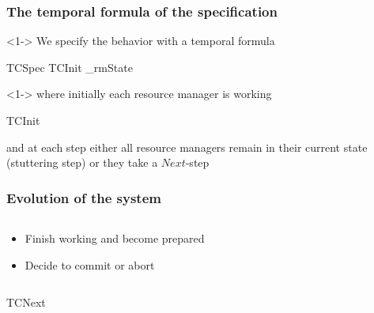 \begin{frame}
    \frametitle{The temporal formula of the specification}
    \begin{uncoverenv}<1->
            We specify the behavior with a temporal formula
        \begin{tlabox}
            TCSpec  TCInit \land \Box [TCNext\,]_{rmState}
        \end{tlabox}
    \end{uncoverenv}
    \begin{uncoverenv}<1->
        where initially each resource manager is working
        \begin{tlabox}
            TCInit 
        \end{tlabox}
        and at each step either all resource managers remain in their
        current state (stuttering step) or they take a $Next$-step
    \end{uncoverenv}
\end{frame}

\begin{frame}
    \frametitle{Evolution of the system}

    \begin{columns}[c]
    \begin{column}{0.65\textwidth}

        \begin{itemize}
            \item<2> Finish working and become prepared
            \item<3> Decide to commit or abort
        \end{itemize}
    \end{column}
    \begin{column}{0.35\textwidth}
        \centering
    \end{column}
    \end{columns}
    \vspace{\baselineskip}
    \begin{tlabox}
        TCNext  {}
         
    \end{tlabox}
\end{frame}

